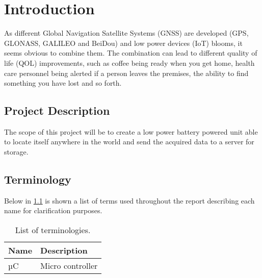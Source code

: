 
\chapter{Introduction}
\label{sec:introduction}
As different Global Navigation Satellite Systems (GNSS) are developed (GPS, GLONASS, GALILEO and BeiDou) and low power devices (IoT) blooms, it seems obvious to combine them.
The combination can lead to different quality of life (QOL) improvements, such as coffee being ready when you get home, health care personnel being alerted if a person leaves the premises, the ability to find something you have lost and so forth.

\section{Project Description}
\label{sec:projectDescription}
The scope of this project will be to create a low power battery powered unit able to locate itself anywhere in the world and send the acquired data to a server for storage.

\section{Terminology}
\label{sec:terminology}
Below in \cref{tab:terminology} is shown a list of terms used throughout the report describing each name for clarification purposes.

\begin{table}[H]
	\centering
	\begin{tabularx}{0.8\textwidth}{l X}
		\toprule
		\textbf{Name} & \textbf{Description} \\
		\midrule
		µC & Micro controller \\
		\bottomrule
	\end{tabularx}
	\caption{List of terminologies.}
	\label{tab:terminology}
\end{table}